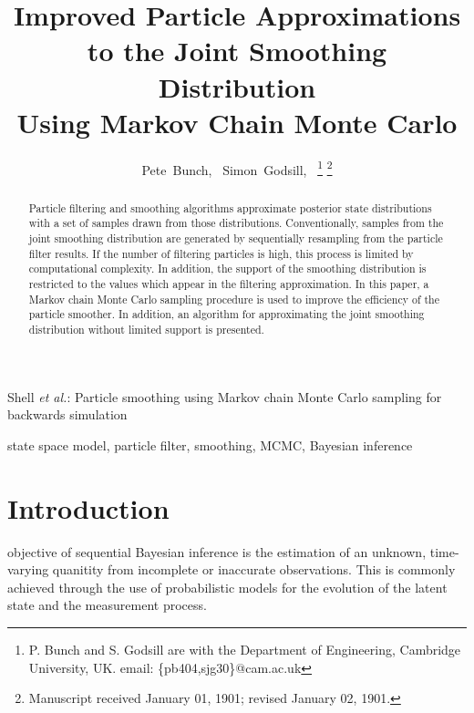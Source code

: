 \documentclass[journal]{IEEEtran}
\begin{document}
\title{Improved Particle Approximations \\ to the Joint Smoothing Distribution \\ Using Markov Chain Monte Carlo}

\author{Pete~Bunch,~\IEEEmembership{}
        Simon~Godsill,~%
\thanks{P. Bunch and S. Godsill are with the Department
of Engineering, Cambridge University, UK. email: \{pb404,sjg30\}@cam.ac.uk}%
\thanks{Manuscript received January 01, 1901; revised January 02, 1901.}}

%
{Shell \MakeLowercase{\textit{et al.}}: Particle smoothing using Markov chain Monte Carlo sampling for backwards simulation}

\maketitle


\begin{abstract}
Particle filtering and smoothing algorithms approximate posterior state distributions with a set of samples drawn from those distributions. Conventionally, samples from the joint smoothing distribution are generated by sequentially resampling from the particle filter results. If the number of filtering particles is high, this process is limited by computational complexity. In addition, the support of the smoothing distribution is restricted to the values which appear in the filtering approximation. In this paper, a Markov chain Monte Carlo sampling procedure is used to improve the efficiency of the particle smoother. In addition, an algorithm for approximating the joint smoothing distribution without limited support is presented.
\end{abstract}



\begin{IEEEkeywords}
state space model, particle filter, smoothing, MCMC, Bayesian inference
\end{IEEEkeywords}



\section{Introduction} \label{sec:intro}

 objective of sequential Bayesian inference is the estimation of an unknown, time-varying quanitity from incomplete or inaccurate observations. This is commonly achieved through the use of probabilistic models for the evolution of the latent state and the measurement process.
\end{document}
